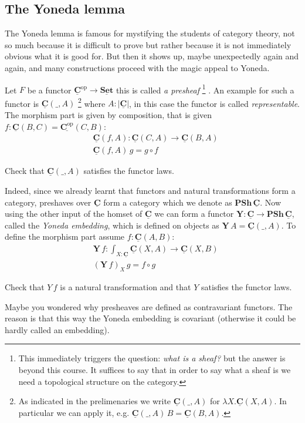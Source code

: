 \documentclass{article}
\newcommand{\Prop}{\mathbf{Prop}}
\newcommand{\Set}{\mathbf{Set}}
\newcommand{\cat}[1]{\underline{\mathbf{#1}}}
\newcommand{\obj}[1]{|#1|}
\newcommand{\homC}[3]{\cat{#1}(#2,#3)}
\newcommand{\op}{\mathrm{op}}
\newcommand{\Nat}{\mathbb{N}}
\newcommand{\Y}{\mathbf{Y}}
\newcommand{\PSh}{\mathbf{PSh}}
\begin{document}
\subsection{The Yoneda lemma}
\label{sec:yoneda-lemma}

The Yoneda lemma is famous for mystifying the students of category theory, not so much because it is difficult to prove but rather because it is not immediately obvious what it is good for. But then it shows up, maybe unexpectedly again and again, and many constructions proceed with the magic appeal to Yoneda. 


Let $F$ be a functor $\cat{C}^\op \to \cat{\Set}$ this is called \emph{a presheaf}%
\footnote{This immediately triggers the question: \emph{what is a sheaf?} but the answer is beyond this course. It suffices to say that in order to say what a sheaf is we need a topological structure on the category.}
. An example for such a functor is $\homC{C}{\_}{A}$
\footnote{As indicated in the prelimenaries we write $\homC{C}{\_}{A}$ for $\lambda X.\homC{C}{X}{A}$. In particular we can apply it, e.g. $\homC{C}{\_}{A}\,B = \homC{C}{B}{A}$.}
 where $A:\obj{\cat{C}}$, in this case the functor is called \emph{representable}. The morphism part is given by composition, that is given $f:\homC{C}{B}{C} = \homC{C^\op}{C}{B}$:
\begin{align*}
&\homC{C}{f}{A} : \homC{C}{C}{A} \to \homC{C}{B}{A} \\
&\homC{C}{f}{A} \,g =  g \circ f
\end{align*}
\begin{Exercise}
  Check that $\homC{C}{\_}{A}$ satisfies the functor laws.
\end{Exercise}
Indeed, since we already learnt that functors and natural transformations form a category, preshaves over $\cat{C}$ form a category which we denote as $\PSh\,\cat{C}$. Now using the other input of the homset of $\cat{C}$ we can form a functor $\Y : \cat{C} \to \PSh\,\cat{C}$, called the \emph{Yoneda embedding}, which is defined on objects as $\Y\,A = \homC{C}{\_}{A}$. To define the morphism part assume $f:\homC{C}{A}{B}$:
\begin{align*}
& \Y\,f :  \int_{X:\cat{C}}\homC{C}{X}{A} \to \homC{C}{X}{B} \\
& (\Y\,f)_X\,g = f \circ g
\end{align*}
\begin{Exercise}
  Check that $Y\,f$ is a natural transformation and that $Y$ satisfies the functor laws.
\end{Exercise}
Maybe you wondered why presheaves are defined as contravariant functors. The reason is that this way the Yoneda embedding is covariant (otherwise it could be hardly called an embedding).
\end{document}
